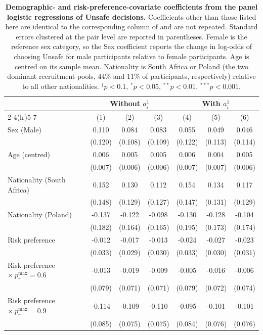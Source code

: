 \documentclass[pdflatex,sn-mathphys-ay]{sn-jnl}
\theoremstyle{thmstyleone}
\theoremstyle{thmstyletwo}
\theoremstyle{thmstylethree}
\begin{document}
\begin{table}[h]
\centering
\small
\caption{\textbf{Demographic- and risk-preference-covariate coefficients from the panel logistic regressions of Unsafe decisions.} Coefficients other than those listed here are identical to the corresponding column of  and are not repeated. Standard errors clustered at the pair level are reported in parentheses. Female is the reference sex category, so the Sex coefficient reports the change in log-odds of choosing Unsafe for male participants relative to female participants. Age is centred on its sample mean. Nationality is South Africa or Poland (the two dominant recruitment pools, \(44\%\) and \(11\%\) of participants, respectively) relative to all other nationalities. \(^{\dagger}p<0.1\), \(^{*}p<0.05\), \(^{**}p<0.01\), \(^{***}p<0.001\).}
\label{tab:si:panel-covariates}
\begin{tabular}{lcccccc}
\toprule
 & \multicolumn{3}{c}{Without \(a_i^1\)}  & \multicolumn{3}{c}{With \(a_i^1\)} \\
\cmidrule(lr){2-4}\cmidrule(lr){5-7}
 & (1) & (2) & (3) & (4) & (5) & (6) \\
\midrule
Sex (Male) & 0.110 & 0.084 & 0.083 & 0.055 & 0.049 & 0.046 \\
 & (0.120) & (0.108) & (0.109) & (0.122) & (0.113) & (0.114) \\
Age (centred) & 0.006 & 0.005 & 0.005 & 0.006 & 0.004 & 0.005 \\
 & (0.007) & (0.006) & (0.006) & (0.007) & (0.007) & (0.006) \\
Nationality (South Africa) & 0.152 & 0.130 & 0.112 & 0.154 & 0.134 & 0.117 \\
 & (0.148) & (0.129) & (0.127) & (0.147) & (0.131) & (0.129) \\
Nationality (Poland) & -0.137 & -0.122 & -0.098 & -0.130 & -0.128 & -0.104 \\
 & (0.182) & (0.164) & (0.165) & (0.195) & (0.173) & (0.174) \\
Risk preference & -0.012 & -0.017 & -0.013 & -0.024 & -0.027 & -0.023 \\
 & (0.033) & (0.029) & (0.030) & (0.033) & (0.030) & (0.031) \\
Risk preference \(\times\ p_r^{\max}=0.6\) & -0.013 & -0.019 & -0.009 & -0.005 & -0.016 & -0.006 \\
 & (0.079) & (0.071) & (0.071) & (0.079) & (0.072) & (0.074) \\
Risk preference \(\times\ p_r^{\max}=0.9\) & -0.114 & -0.109 & -0.110 & -0.095 & -0.101 & -0.101 \\
 & (0.085) & (0.075) & (0.075) & (0.084) & (0.076) & (0.076) \\
\bottomrule
\end{tabular}
\end{table}
\end{document}
